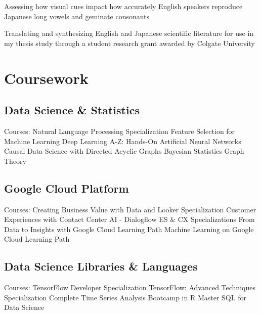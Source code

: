 \documentclass[letterpaper]{deedy-resume_sm}
\begin{document}
\begin{tightitemize}
\item Assessing how visual cues impact how accurately English speakers reproduce Japanese long vowels and geminate consonants
\end{tightitemize}
\sectionspace

\begin{tightitemize}
\item Translating and synthesizing English and Japanese scientific literature for use in my thesis study through a student research grant awarded by Colgate University
\end{tightitemize}
\sectionspace

\section{Coursework}
\subsection{Data Science \& Statistics}
Courses: Natural Language Processing Specialization \textbullet{} Feature Selection for Machine Learning \textbullet{} Deep Learning A-Z: Hands-On Artificial Neural Networks \textbullet{} Causal Data Science with Directed Acyclic Graphs \textbullet{} Bayesian Statistics \textbullet{} Graph Theory

\subsection{Google Cloud Platform}
Courses: Creating Business Value with Data and Looker Specialization \textbullet{} Customer Experiences with Contact Center AI - Dialogflow ES \& CX Specializations \textbullet{} From Data to Insights with Google Cloud Learning Path \textbullet{} Machine Learning on Google Cloud Learning Path

\subsection{Data Science Libraries \& Languages}
Courses: TensorFlow Developer Specialization \textbullet{} TensorFlow: Advanced Techniques Specialization \textbullet{} Complete Time Series Analysis Bootcamp in R \textbullet{} Master SQL for Data Science
\end{document}
